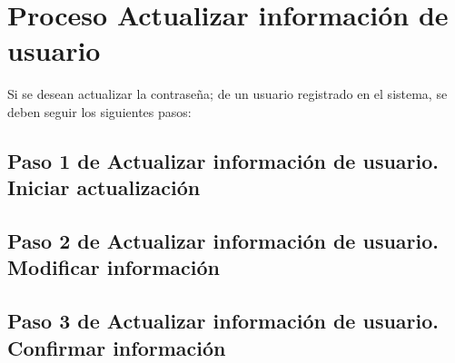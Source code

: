 \chapter{Proceso Actualizar información de usuario}
	Si se desean actualizar la contraseña; de un usuario registrado en
	el sistema, se deben seguir los siguientes pasos: 
	
\section{Paso 1 de Actualizar información de usuario. 
	Iniciar actualización}
	

\section{Paso 2 de Actualizar información de usuario. 
		Modificar información}
	

\section{Paso 3 de Actualizar información de usuario. 
		Confirmar información}
	

